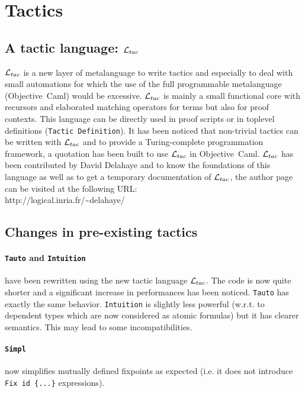 \documentclass[11pt]{article}
\begin{document}
\section{Tactics}
\label{Tactics}
\def\oc{{\sf Objective~Caml}}

\subsection{A tactic language: ${\cal L}_{tac}$}

${\cal L}_{tac}$ is a new layer of metalanguage to write tactics and especially to deal
with small automations for which the use of the full programmable metalanguage
(\oc{}) would be excessive. ${\cal L}_{tac}$ is mainly a	small functional core with
recursors and elaborated matching operators for terms but also for proof
contexts. This language can be directly used in proof scripts or in toplevel
definitions ({\tt Tactic~Definition}). It has been noticed that non-trivial
tactics can be written with ${\cal L}_{tac}$ and to provide a Turing-complete
programmation framework, a quotation has been built to use ${\cal L}_{tac}$ in \oc{}.
${\cal L}_{tac}$ has been contributed by David Delahaye and to know the foundations of
this language as well as to get a temporary documentation of ${\cal L}_{tac}$, the
author page can be visited at the following URL:\\

http://logical.inria.fr/\~{}delahaye/

\subsection{Changes in pre-existing tactics}
\label{TacticChanges}

   \paragraph{{\tt Tauto} and {\tt Intuition}} have been rewritten using the
   new tactic language ${\cal L}_{tac}$. The code is now quite shorter and a significant
   increase in performances has been noticed. {\tt Tauto} has exactly the same
   behavior. {\tt Intuition} is slightly less powerful (w.r.t. to dependent
   types which are now considered as atomic formulas) but it has clearer
   semantics. This may lead to some incompatibilities.

  \paragraph{{\tt Simpl}} now simplifies mutually defined fixpoints
  as expected (i.e. it does not introduce {\tt Fix id
  \{...\}} expressions).
\end{document}
